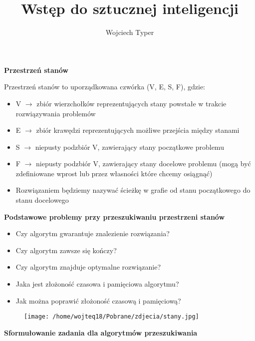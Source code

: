 \documentclass{article}
\title{Wstęp do sztucznej inteligencji}
\author{Wojciech Typer}
\date{}
\begin{document}
\maketitle
\vspace{1\baselineskip}
\textbf{Przestrzeń stanów}  \par
\vspace{1\baselineskip}
Przestrzeń stanów to uporządkowana czwórka (V, E, S, F), gdzie: \par
\begin{itemize}
    \item V $\rightarrow$ zbiór wierzchołków reprezentujących stany powstałe w trakcie rozwiązywania problemów
    \item E $\rightarrow$ zbiór krawędzi reprezentujących możliwe przejścia między stanami
    \item S $\rightarrow$ niepusty podzbiór V, zawierający stany początkowe problemu
    \item F $\rightarrow$ niepusty podzbiór V, zawierający stany docelowe problemu (mogą być zdefiniowane wprost lub przez własności które chcemy osiągnąć)
    \item Rozwiązaniem będziemy nazywać ścieżkę w grafie od stanu początkowego do stanu docelowego
\end{itemize}
\vspace{1\baselineskip}
\textbf{Podstawowe problemy przy przeszukiwaniu przestrzeni stanów}  \par
\vspace{1\baselineskip}
\begin{itemize}
    \item Czy algorytm gwarantuje znalezienie rozwiązania?
    \item Czy algorytm zawsze się kończy?
    \item Czy algorytm znajduje optymalne rozwiązanie?
    \item Jaka jest złożoność czasowa i pamięciowa algorytmu?
    \item Jak można poprawić złożoność czasową i pamięciową?
\end{itemize}
\vspace{1\baselineskip}
\begin{figure}[H]
    \centering
    \texttt{[image: /home/wojteq18/Pobrane/zdjecia/stany.jpg]}
    \label{fig:example_image}
\end{figure}
\vspace{1\baselineskip}
\textbf{Sformułowanie zadania dla algorytmów przeszukiwania}  \par
\end{document}
